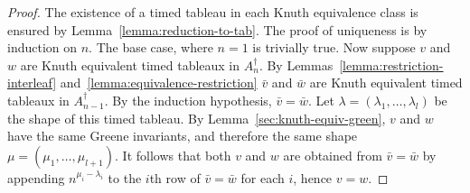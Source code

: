 \documentclass[10pt]{amsproc}
\theoremstyle{definition}
\theoremstyle{remark}
\begin{document}
\begin{proof}
  The existence of a timed tableau in each Knuth equivalence class is ensured by Lemma~\ref{lemma:reduction-to-tab}.
  The proof of uniqueness is by induction on $n$.
  The base case, where $n=1$ is trivially true.
  Now suppose $v$ and $w$ are Knuth equivalent timed tableaux in $A_n^\dagger$.
  By Lemmas~\ref{lemma:restriction-interleaf} and~\ref{lemma:equivalence-restriction} $\bar v$ and $\bar w$ are Knuth equivalent timed tableaux in $A_{n-1}^\dagger$.
  By the induction hypothesis, $\bar v=\bar w$.
  Let $\lambda=(\lambda_1,\dotsc,\lambda_l)$ be the shape of this timed tableau.
  By Lemma~\ref{sec:knuth-equiv-green}, $v$ and $w$ have the same Greene invariants, and therefore the same shape $\mu=(\mu_1,\dotsc,\mu_{l+1})$.
  It follows that both $v$ and $w$ are obtained from $\bar v=\bar w$ by appending $n^{\mu_i-\lambda_i}$ to the $i$th row of $\bar v= \bar w$ for each $i$, hence $v=w$.
\end{proof}
\end{document}
